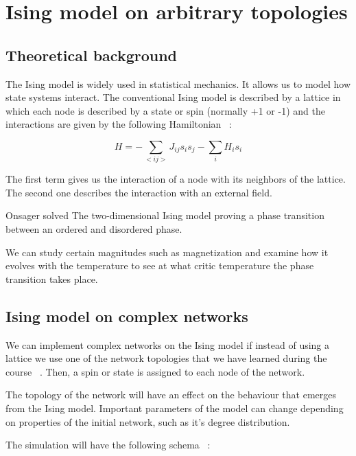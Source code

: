 \chapter{Ising model on arbitrary topologies}




\section{Theoretical background}


The Ising model is widely used in statistical mechanics. It allows us to model how state systems interact. The conventional Ising model is described by a lattice in which each node is described by a state or spin (normally +1 or -1) and the interactions are given by the following Hamiltonian ~\cite{farside329Lectures}:

\begin{equation}
    H = - \sum_{<ij>} J_{ij}s_{i}s_{j} - \sum_{i} H_{i}s_{i}
\end{equation}

The first term gives us the interaction of a node with its neighbors of the lattice. The second one describes the interaction with an external field. 

Onsager solved The two-dimensional Ising model proving a phase transition between an ordered and disordered phase. 

We can study certain magnitudes such as magnetization and examine how it evolves with the temperature to see at what critic temperature the phase transition takes place.

\section{Ising model on complex networks}

We can implement complex networks on the Ising model if instead of using a lattice we use one of the network topologies that we have learned during the course ~\cite{dedomeniconotes}. Then, a spin or state is assigned to each node of the network.

The topology of the network will have an effect on the behaviour that emerges from the Ising model.  Important parameters of the model can change depending on properties of the initial network, such as it's degree distribution.



The simulation will have the following schema ~\cite{shekaarijafari2021theorysimulationising}:

